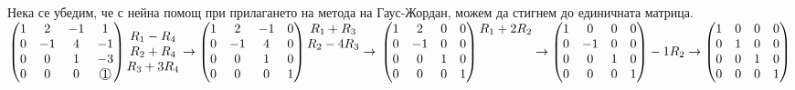 \documentclass[12pt]{article}
\newcommand*{\mcirc}[1]{\text{\raisebox{.5pt}{\textcircled{\raisebox{-.9pt} {#1}}}}}
\begin{document}
Нека се убедим, че с нейна помощ при прилагането на метода на Гаус-Жордан, можем да стигнем до единичната матрица. \\

$\begin{pmatrix}
    1 &  2 & -1 &  1 \\
    0 & -1 &  4 & -1 \\
    0 &  0 &  1 & -3 \\
    0 &  0 &  0 & \mcirc{1}
\end{pmatrix} \begin{matrix}
    R_1 - R_4 \\
    R_2 + R_4 \\
    R_3 + 3R_4
    \\
\end{matrix} \to \begin{pmatrix}
    1 &  2 & -1 & 0 \\
    0 & -1 &  4 & 0 \\
    0 &  0 &  1 & 0 \\
    0 &  0 &  0 & 1
\end{pmatrix} \begin{matrix}
    R_1 + R_3 \\
    R_2 - 4R_3 \\
    \\
    \\
\end{matrix} \to \\\\\\
\begin{pmatrix}
    1 &  2 & 0 & 0 \\
    0 & -1 & 0 & 0 \\
    0 &  0 & 1 & 0 \\
    0 &  0 & 0 & 1
\end{pmatrix} \begin{matrix}
    R_1 + 2R_2 \\
    \\
    \\
    \\
\end{matrix} \to \begin{pmatrix}
    1 &  0 & 0 & 0 \\
    0 & -1 & 0 & 0 \\
    0 &  0 & 1 & 0 \\
    0 &  0 & 0 & 1
\end{pmatrix} -1R_2 \to \begin{pmatrix}
    1 & 0 & 0 & 0 \\
    0 & 1 & 0 & 0 \\
    0 & 0 & 1 & 0 \\
    0 & 0 & 0 & 1
\end{pmatrix}$ \\\\
\end{document}
